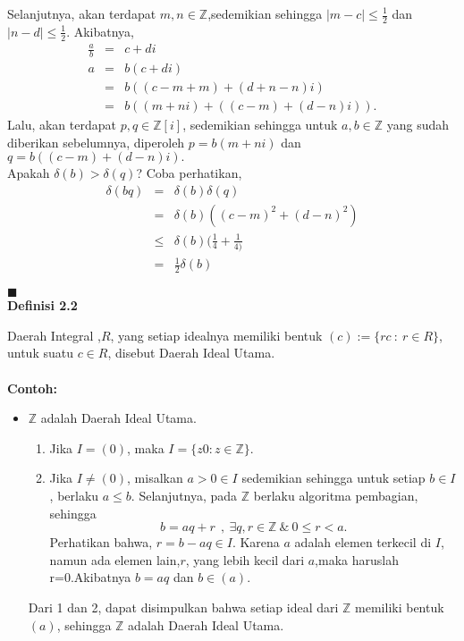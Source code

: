 \begin{enumerate}
\begin{itemize}
		Selanjutnya, akan terdapat $m,n\in \mathbb{Z}$,sedemikian sehingga $|m-c| \le \frac{1}{2}$ dan $|n-d| \le \frac{1}{2}$. Akibatnya,
			$$\begin{array}{rcl}
			\frac{a}{b} &=& c+d\textit{i}\\
			a &=& b (c+d\textit{i})\\
			&=& b((c-m+m) + (d+n-n) \textit{i})\\
			&=& b((m+n\textit{i})+((c-m) +(d-n)\textit{i})).
			\end{array}$$
		Lalu, akan terdapat $p,q \in \mathbb{Z}[\textit{i}]$, sedemikian sehingga untuk $a,b\in \mathbb{Z}$ yang sudah diberikan sebelumnya, diperoleh $p = b(m+n\textit{i})$ dan $q= b((c-m) +(d-n)\textit{i}).$
\\		Apakah $\delta(b) > \delta(q)$? Coba perhatikan,
			$$\begin{array}{rcl}
			\delta(bq) &=& \delta(b) \delta(q)\\
			&=& \delta(b)((c-m)^2+(d-n)^2)\\
			&\le& \delta(b)(\frac{1}{4} +\frac{1}{4)}\\
			&=& \frac{1}{2} \delta(b)
			\end{array}$$
		\end{itemize}
	\end{enumerate}
	$\blacksquare$
\\
\textbf{Definisi 2.2}
\par 	Daerah Integral ,$R$, yang setiap idealnya memiliki bentuk $(c):=\{ rc~:~r\in R\}$, untuk suatu $c\in R$, disebut Daerah Ideal Utama.
\\
\\	\textbf{Contoh:}
	\begin{itemize}
	\item $\mathbb{Z}$ adalah Daerah Ideal Utama.
	\begin{enumerate}
	\item Jika $I =(0)$, maka $I=\{z0: z\in \mathbb{Z}\}$.
	\item Jika $I \ne (0)$, misalkan $a>0 \in I$ sedemikian sehingga untuk setiap $b \in I$, berlaku $a \le b$. Selanjutnya, pada $\mathbb{Z}$ berlaku algoritma pembagian, sehingga $$b=aq+r~~,~\exists q,r \in \mathbb{Z} ~\&~ 0\le r <a.$$
	Perhatikan bahwa, $r=b-aq \in I.$ Karena $a$ adalah elemen terkecil di $I$, namun ada elemen lain,$r$, yang lebih kecil dari $a$,maka haruslah r=0.Akibatnya $b=aq$ dan $b\in (a).$
	\end{enumerate}
	Dari 1 dan 2, dapat disimpulkan bahwa setiap ideal dari $\mathbb{Z}$ memiliki bentuk $(a)$, sehingga $\mathbb{Z}$ adalah Daerah Ideal Utama.
	\end{itemize}

